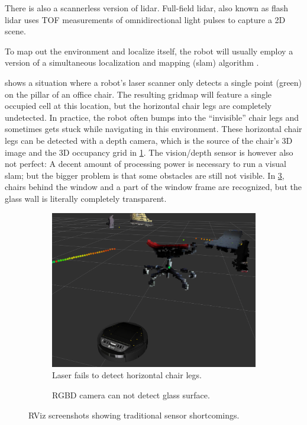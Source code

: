 There is also a scannerless version of lidar. Full-field lidar, also
known as flash lidar \cite{Payne2008} uses TOF measurements of
omnidirectional light pulses to capture a 2D scene.

To map out the environment and localize itself, the robot will usually
employ a version of a simultaneous localization and mapping (slam)
algorithm \cite{Cadena2016}.

 shows a situation where a robot's laser scanner only detects a single point (green) on the pillar of an office chair. The resulting gridmap will feature a single occupied cell at this location, but the horizontal chair legs are completely undetected. In practice, the robot often bumps into the ``invisible'' chair legs and sometimes gets stuck while navigating in this environment. These horizontal chair legs can be detected with a depth camera, which is the source of the chair's 3D image and the 3D occupancy grid in \cref{fig:lidar_rgbd}. The vision/depth sensor is however also not perfect: A decent amount of processing power is necessary to run a visual slam; but the bigger problem is that some obstacles are still not visible. In \cref{fig:rgbd_glasswall}, chairs behind the window and a part of the window frame are recognized, but the glass wall is literally completely transparent.

\begin{figure}
    \begin{subfigure}[t]{.485\textwidth}
        \centering
        \includegraphics[max width=\textwidth]{gfx/screenshots/chair_laser_vs_rgbd}
        \caption{Laser fails to detect horizontal chair legs.}
        \label{fig:lidar_rgbd}
    \end{subfigure}%
    \hfill%
    \begin{subfigure}[t]{.485\textwidth}
        \centering
        \def\svgwidth{\linewidth}
        
        \caption{RGBD camera can not detect glass surface.}
        \label{fig:rgbd_glasswall}
    \end{subfigure}%
    \caption{RViz screenshots showing traditional sensor shortcomings.}
\end{figure}

